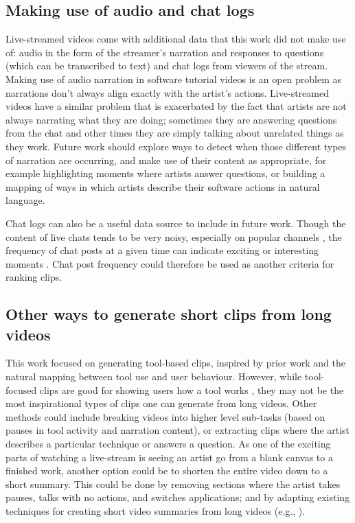 \subsection{Making use of audio and chat logs}
Live-streamed videos come with additional data that this work did not make use of: audio in the form of the streamer's narration and responses to questions (which can be transcribed to text) and chat logs from viewers of the stream. Making use of audio narration in software tutorial videos is an open problem \cite{Chi2012} as narrations don't always align exactly with the artist's actions. Live-streamed videos have a similar problem that is exacerbated by the fact that artists are not always narrating what they are doing; sometimes they are answering questions from the chat and other times they are simply talking about unrelated things as they work. Future work should explore ways to detect when those different types of narration are occurring, and make use of their content as appropriate, for example highlighting moments where artists answer questions, or building a mapping of ways in which artists describe their software actions in natural language.

Chat logs can also be a useful data source to include in future work. Though the content of live chats tends to be very noisy, especially on popular channels \cite{Hamilton2014}, the frequency of chat posts at a given time can indicate exciting or interesting moments \cite{Pan2016}. Chat post frequency could therefore be used as another criteria for ranking clips.

\subsection{Other ways to generate short clips from long videos}
This work focused on generating tool-based clips, inspired by prior work \cite{Grossman2010a, Lafreniere2014} and the natural mapping between tool use and user behaviour. However, while tool-focused clips are good for showing users how a tool works \cite{Grossman2010a}, they may not be the most inspirational types of clips one can generate from long videos. Other methods could include breaking videos into higher level sub-tasks (based on pauses in tool activity and narration content), or extracting clips where the artist describes a particular technique or answers a question. As one of the exciting parts of watching a live-stream is seeing an artist go from a blank canvas to a finished work, another option could be to shorten the entire video down to a short summary. This could be done by removing sections where the artist takes pauses, talks with no actions, and switches applications; and by adapting existing techniques for creating short video summaries from long videos (e.g., \cite{Truong2007}). 

